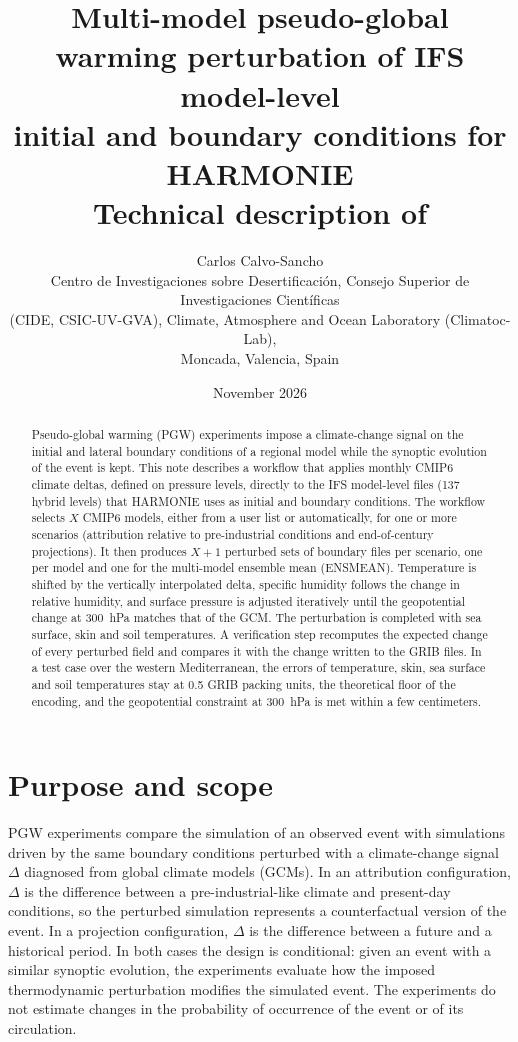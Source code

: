 \documentclass[11pt,a4paper]{article}
\title{\textbf{Multi-model pseudo-global warming perturbation of IFS model-level\\
initial and boundary conditions for HARMONIE}\\[4pt]
\large Technical description of \code{pgw\_workflow\_modelLevels}}
\author{Carlos Calvo-Sancho\\[4pt]
\small Centro de Investigaciones sobre Desertificaci\'on, Consejo Superior de Investigaciones Cient\'ificas\\
\small (CIDE, CSIC-UV-GVA), Climate, Atmosphere and Ocean Laboratory (Climatoc-Lab),\\
\small Moncada, Valencia, Spain}
\date{November 2026}
\begin{document}
\maketitle
\thispagestyle{fancy}

\begin{abstract}
\noindent
Pseudo-global warming (PGW) experiments impose a climate-change signal on the
initial and lateral boundary conditions of a regional model while the
synoptic evolution of the event is kept. This note describes a workflow that
applies monthly CMIP6 climate deltas, defined on pressure levels, directly to
the IFS model-level files (137 hybrid levels) that HARMONIE uses as initial
and boundary conditions. The workflow selects $X$ CMIP6 models, either from a
user list or automatically, for one or more scenarios (attribution relative
to pre-industrial conditions and end-of-century projections). It then
produces $X+1$ perturbed sets of boundary files per scenario, one per model
and one for the multi-model ensemble mean (ENSMEAN). Temperature is shifted
by the vertically interpolated delta, specific humidity follows the change in
relative humidity, and surface pressure is adjusted iteratively until the
geopotential change at \SI{300}{hPa} matches that of the GCM. The perturbation
is completed with sea surface, skin and soil temperatures. A verification
step recomputes the expected change of every perturbed field and compares it
with the change written to the GRIB files. In a test case over the western
Mediterranean, the errors of temperature, skin, sea surface and soil
temperatures stay at 0.5 GRIB packing units, the theoretical floor of the
encoding, and the geopotential constraint at \SI{300}{hPa} is met within a
few centimeters.
\end{abstract}

\tableofcontents
\newpage

\section{Purpose and scope}
\label{sec:intro}

PGW experiments \citep{Schar1996,Brogli2023} compare the simulation of an
observed event with simulations driven by the same boundary conditions
perturbed with a climate-change signal $\Delta$ diagnosed from global climate
models (GCMs). In an attribution configuration, $\Delta$ is the difference
between a pre-industrial-like climate and present-day conditions, so the
perturbed simulation represents a counterfactual version of the event. In a
projection configuration, $\Delta$ is the difference between a future and a
historical period. In both cases the design is conditional: given an event
with a similar synoptic evolution, the experiments evaluate how the imposed
thermodynamic perturbation modifies the simulated event. The experiments do
not estimate changes in the probability of occurrence of the event or of its
circulation.
\end{document}
